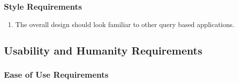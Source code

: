 \documentclass[]{article}
\begin{document}
\subsubsection{Style Requirements}
\label{ssub:style_requirements}
\begin{enumerate}[{LF}5. ]
	\item The overall design should look familiar to other query based applications.
\end{enumerate}


\subsection{Usability and Humanity Requirements}
\label{sub:usability_and_humanity_requirements}

\subsubsection{Ease of Use Requirements}
\label{ssub:ease_of_use_requirements}
\end{document}
